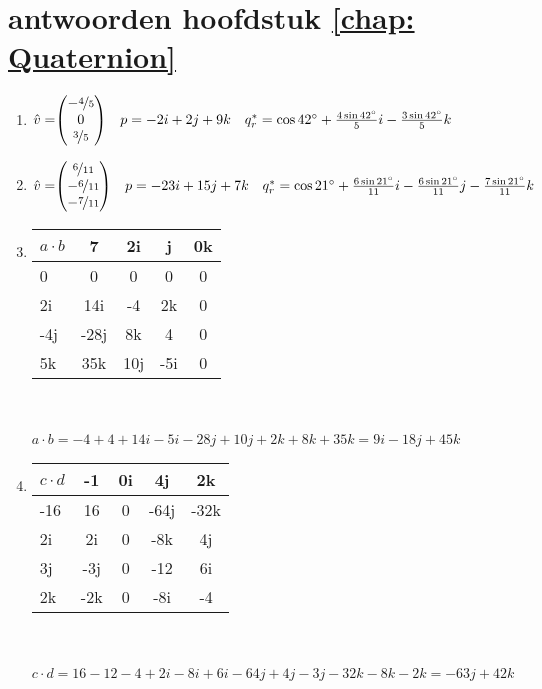 \section{antwoorden  hoofdstuk \ref{chap: Quaternion}}
\begin{enumerate}
	\item 
	$\hat{v} = \vecdrie{-\nicefrac{4}{5}}{0}{\nicefrac{3}{5}}
	\quad p  = -2i +2j + 9k 
	\quad q^*_r  =  \cos 42 \degree  + \frac{4 \sin 42 \degree}{5}i -
	\frac{3 \sin 42 \degree}{5}k$
	
	\item 
	$\hat{v} = \vecdrie{\nicefrac{6}{11}}{-\nicefrac{6}{11}}{-\nicefrac{7}{11}}
	\quad p  = -23i +15j + 7k 
	\quad q^*_r  =  \cos 21 \degree  + \frac{6 \sin 21 \degree}{11}i 
	-\frac{6 \sin 21 \degree}{11}j
	-\frac{7 \sin 21 \degree}{11}k$
	
	\item
	\begin{tabular}{ | l || c | c |c |c |}
		\hline
		$ a\cdot b $ & 7 & 2i   & j & 0k \\ \hline \hline
		0    & 0 & 0   &   0        & 0  \\ \hline
		2i    & 14i & -4   &   2k        & 0  \\ \hline
		-4j   & -28j &  8k &   4     & 0\\ \hline
		5k    & 35k  & 10j   & -5i   & 0\\ 
		\hline 
	\end{tabular} \\ \\
	$ a\cdot b = -4 + 4 +14i -5i -28j +10j +2k + 8k + 35k =  9i -18j +45k $
	
	\item
	\begin{tabular}{ | l || c | c |c |c |}
		\hline
		$ c\cdot d $ & -1 & 0i   & 4j & 2k \\ \hline \hline
		-16    & 16 & 0   &   -64j        & -32k  \\ \hline
		2i    & 2i & 0   &   -8k        & 4j  \\ \hline
		3j   & -3j &  0 &   -12     & 6i\\ \hline
		2k    & -2k  & 0   & -8i   & -4\\ 
		\hline 
	\end{tabular} \\ \\
	$ c\cdot d = 16 -12  -4  + 2i -8i +6i  -64j +4j -3j  -32k - 8k -2k =  -63j + 42k $
	

\end{enumerate}
